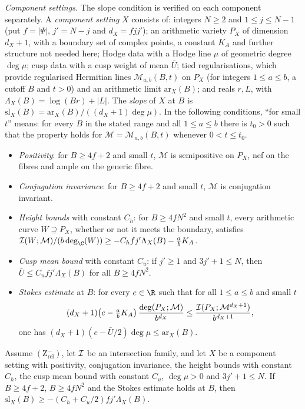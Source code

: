 \emph{Component settings.} The slope condition is verified on each component separately. A \emph{component
setting} $X$ consists of: integers $N\ge2$ and $1\le j\le N-1$ (put $f=|\Psi|$, $j'=N-j$ and $d_X=fjj'$); an
arithmetic variety $P_X$ of dimension $d_X+1$, with a boundary set of complex points, a constant $K_A$ and further
structure not needed here; Hodge data with a Hodge line $\mu$ of geometric degree $\deg\mu$; cusp data with a cusp
weight of mean $\bar U$; tied regularisations, which provide regularised Hermitian lines $\mathcal M_{a,b}(B,t)$ on
$P_X$ (for integers $1\le a\le b$, a cutoff $B$ and $t>0$) and an arithmetic limit $\mathrm{ar}_X(B)$; and reals
$r,L$, with $\Lambda_X(B)=\log(Br)+|L|$. The \emph{slope} of $X$ at $B$ is
$\mathrm{sl}_X(B)=\mathrm{ar}_X(B)/((d_X+1)\deg\mu)$. In the following conditions, ``for small $t$'' means: for every
$B$ in the stated range and all $1\le a\le b$ there is $t_0>0$ such that the property holds for
$\mathcal M=\mathcal M_{a,b}(B,t)$ whenever $0<t\le t_0$.
\begin{itemize}
\item \emph{Positivity}: for $B\ge4f+2$ and small $t$, $\mathcal M$ is semipositive on $P_X$, nef on the fibres and
  ample on the generic fibre.
\item \emph{Conjugation invariance}: for $B\ge4f+2$ and small $t$, $\mathcal M$ is conjugation invariant.
\item \emph{Height bounds} with constant $C_h$: for $B\ge4fN^2$ and small $t$, every arithmetic curve
  $W\supseteq P_X$, whether or not it meets the boundary, satisfies
  $\volthmII(W;\mathcal M)/(b\deg_\C(W))\ge-C_hfj'\Lambda_X(B)-\frac abK_A$.
\item \emph{Cusp mean bound} with constant $C_u$: if $j'\ge1$ and $3j'+1\le N$, then
  $\bar U\le C_ufj'\Lambda_X(B)$ for all $B\ge4fN^2$.
\item \emph{Stokes estimate} at $B$: for every $e\in\R$ such that for all $1\le a\le b$ and small $t$
  \begin{equation}\label{pf:volthm:eq:stokeshyp}
  (d_X+1)\bigl(e-\tfrac abK_A\bigr)\,\frac{\deg(P_X;\mathcal M)}{b^{d_X}}\le
  \frac{\mathcal{I}(P_X;\mathcal M^{d_X+1})}{b^{d_X+1}},
  \end{equation}
  one has $(d_X+1)(e-\bar U/2)\deg\mu\le\mathrm{ar}_X(B)$.
\end{itemize}

\begin{lemma}\label{pf:volthm:lem:slX}
Assume $(\mathrm{Z}^-_{\mathrm{rel}})$, let $\mathcal{I}$ be an intersection family, and let $X$ be a component setting
with positivity, conjugation invariance, the height bounds with constant $C_h$, the cusp mean bound with constant
$C_u$, $\deg\mu>0$ and $3j'+1\le N$. If $B\ge4f+2$, $B\ge4fN^2$ and the Stokes estimate holds at $B$, then
$\mathrm{sl}_X(B)\ge-(C_h+C_u/2)fj'\Lambda_X(B)$.
\end{lemma}

